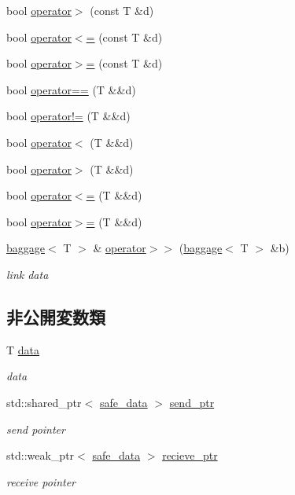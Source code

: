 \begin{DoxyCompactItemize}
\item 
bool \hyperlink{classfractal_1_1baggage_a4493652a35653bf385084afbc26a7957}{operator$>$} (const T \&d)
\item 
bool \hyperlink{classfractal_1_1baggage_ab76eb0939f7a13f39ee721c1be8579bf}{operator$<$=} (const T \&d)
\item 
bool \hyperlink{classfractal_1_1baggage_a4552b3ca7b1aefaa892483d4c1694a3c}{operator$>$=} (const T \&d)
\item 
bool \hyperlink{classfractal_1_1baggage_af6cfa387876a27f6eab20938fc428d29}{operator==} (T \&\&d)
\item 
bool \hyperlink{classfractal_1_1baggage_ac4ef57664b87f4042451bbf431e03fa2}{operator!=} (T \&\&d)
\item 
bool \hyperlink{classfractal_1_1baggage_a249ba93cdd3c96fa0bdd13c6fe665ad7}{operator$<$} (T \&\&d)
\item 
bool \hyperlink{classfractal_1_1baggage_ae712ad4484a737818897ef6057253bcb}{operator$>$} (T \&\&d)
\item 
bool \hyperlink{classfractal_1_1baggage_af153cc94c9ec942b1165486192797326}{operator$<$=} (T \&\&d)
\item 
bool \hyperlink{classfractal_1_1baggage_ac1970dbf50991b785aa88707edce0e62}{operator$>$=} (T \&\&d)
\item 
\hyperlink{classfractal_1_1baggage}{baggage}$<$ T $>$ \& \hyperlink{classfractal_1_1baggage_aadd6a156f9116e6b9b4afa36ce998567}{operator$>$$>$} (\hyperlink{classfractal_1_1baggage}{baggage}$<$ T $>$ \&b)
\begin{DoxyCompactList}\small\item\em link data \end{DoxyCompactList}\end{DoxyCompactItemize}
\subsection*{非公開変数類}
\begin{DoxyCompactItemize}
\item 
T \hyperlink{classfractal_1_1baggage_a4ab1a1ce03c4f278087f62f7feac8cc3}{data}
\begin{DoxyCompactList}\small\item\em data \end{DoxyCompactList}\item 
std\+::shared\+\_\+ptr$<$ \hyperlink{structfractal_1_1baggage_1_1safe__data}{safe\+\_\+data} $>$ \hyperlink{classfractal_1_1baggage_aff8cc1cd923c97ecc18b7b574889ca63}{send\+\_\+ptr}
\begin{DoxyCompactList}\small\item\em send pointer \end{DoxyCompactList}\item 
std\+::weak\+\_\+ptr$<$ \hyperlink{structfractal_1_1baggage_1_1safe__data}{safe\+\_\+data} $>$ \hyperlink{classfractal_1_1baggage_ac6610690826b59751242686d488efe88}{recieve\+\_\+ptr}
\begin{DoxyCompactList}\small\item\em receive pointer \end{DoxyCompactList}\end{DoxyCompactItemize}
